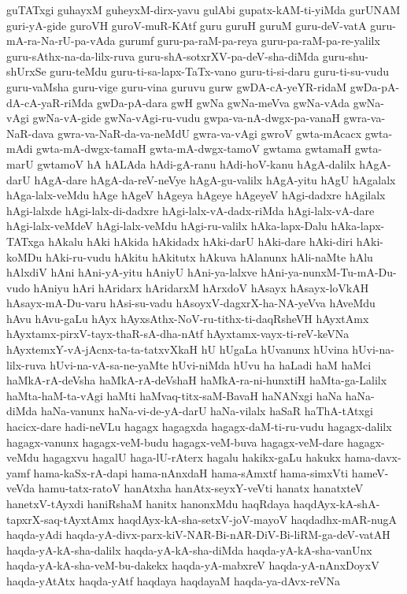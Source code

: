 {guTATxgi
guhayxM
guheyxM-dirx-yavu
gulAbi
gupatx-kAM-ti-yiMda
gurUNAM
guri-yA-gide
guroVH
guroV-muR-KAtf
guru
guruH
guruM
guru-deV-vatA
guru-mA-ra-Na-rU-pa-vAda
gurumf
guru-pa-raM-pa-reya
guru-pa-raM-pa-re-yalilx
guru-sAthx-na-da-lilx-ruva
guru-shA-sotxrXV-pa-deV-sha-diMda
guru-shu-shUrxSe
guru-teMdu
guru-ti-sa-lapx-TaTx-vano
guru-ti-si-daru
guru-ti-su-vudu
guru-vaMsha
guru-vige
guru-vina
guruvu
gurw
gwDA-cA-yeYR-ridaM
gwDa-pA-dA-cA-yaR-riMda
gwDa-pA-dara
gwH
gwNa
gwNa-meVva
gwNa-vAda
gwNa-vAgi
gwNa-vA-gide
gwNa-vAgi-ru-vudu
gwpa-va-nA-dwgx-pa-vanaH
gwra-va-NaR-dava
gwra-va-NaR-da-va-neMdU
gwra-va-vAgi
gwroV
gwta-mAcacx
gwta-mAdi
gwta-mA-dwgx-tamaH
gwta-mA-dwgx-tamoV
gwtama
gwtamaH
gwta-marU
gwtamoV
hA
hALAda
hAdi-gA-ranu
hAdi-hoV-kanu
hAgA-dalilx
hAgA-darU
hAgA-dare
hAgA-da-reV-neVye
hAgA-gu-valilx
hAgA-yitu
hAgU
hAgalalx
hAga-lalx-veMdu
hAge
hAgeV
hAgeya
hAgeye
hAgeyeV
hAgi-dadxre
hAgilalx
hAgi-lalxde
hAgi-lalx-di-dadxre
hAgi-lalx-vA-dadx-riMda
hAgi-lalx-vA-dare
hAgi-lalx-veMdeV
hAgi-lalx-veMdu
hAgi-ru-valilx
hAka-lapx-Dalu
hAka-lapx-TATxga
hAkalu
hAki
hAkida
hAkidadx
hAki-darU
hAki-dare
hAki-diri
hAki-koMDu
hAki-ru-vudu
hAkitu
hAkitutx
hAkuva
hAlanunx
hAli-naMte
hAlu
hAlxdiV
hAni
hAni-yA-yitu
hAniyU
hAni-ya-lalxve
hAni-ya-nunxM-Tu-mA-Du-vudo
hAniyu
hAri
hAridarx
hAridarxM
hArxdoV
hAsayx
hAsayx-loVkAH
hAsayx-mA-Du-varu
hAsi-su-vadu
hAsoyxV-dagxrX-ha-NA-yeVva
hAveMdu
hAvu
hAvu-gaLu
hAyx
hAyxsAthx-NoV-ru-tithx-ti-daqRsheVH
hAyxtAmx
hAyxtamx-pirxV-tayx-thaR-sA-dha-nAtf
hAyxtamx-vayx-ti-reV-keVNa
hAyxtemxY-vA-jAcnx-ta-ta-tatxvXkaH
hU
hUgaLa
hUvanunx
hUvina
hUvi-na-lilx-ruva
hUvi-na-vA-sa-ne-yaMte
hUvi-niMda
hUvu
ha
haLadi
haM
haMci
haMkA-rA-deVsha
haMkA-rA-deVshaH
haMkA-ra-ni-hunxtiH
haMta-ga-Lalilx
haMta-haM-ta-vAgi
haMti
haMvaq-titx-saM-BavaH
haNANxgi
haNa
haNa-diMda
haNa-vanunx
haNa-vi-de-yA-darU
haNa-vilalx
haSaR
haThA-tAtxgi
hacicx-dare
hadi-neVLu
hagagx
hagagxda
hagagx-daM-ti-ru-vudu
hagagx-dalilx
hagagx-vanunx
hagagx-veM-budu
hagagx-veM-buva
hagagx-veM-dare
hagagx-veMdu
hagagxvu
hagalU
haga-lU-rAterx
hagalu
hakikx-gaLu
hakukx
hama-davx-yamf
hama-kaSx-rA-dapi
hama-nAnxdaH
hama-sAmxtf
hama-simxVti
hameV-veVda
hamu-tatx-ratoV
hanAtxha
hanAtx-seyxY-veVti
hanatx
hanatxteV
hanetxV-tAyxdi
haniRshaM
hanitx
hanonxMdu
haqRdaya
haqdAyx-kA-shA-tapxrX-saq-tAyxtAmx
haqdAyx-kA-sha-setxV-joV-mayoV
haqdadhx-mAR-nugA
haqda-yAdi
haqda-yA-divx-parx-kiV-NAR-Bi-nAR-DiV-Bi-liRM-ga-deV-vatAH
haqda-yA-kA-sha-dalilx
haqda-yA-kA-sha-diMda
haqda-yA-kA-sha-vanUnx
haqda-yA-kA-sha-veM-bu-dakekx
haqda-yA-mabxreV
haqda-yA-nAnxDoyxV
haqda-yAtAtx
haqda-yAtf
haqdaya
haqdayaM
haqda-ya-dAvx-reVNa
}
